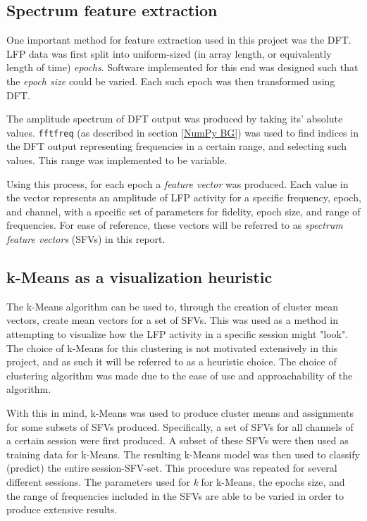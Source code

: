 \documentclass{kththesis}
\begin{document}
\subsection{Spectrum feature extraction}\label{DFT Method}

One important method for feature extraction used in this project was the DFT. 
LFP data was first split into uniform-sized (in array length, or equivalently length of time) \textit{epochs}.
Software implemented for this end was designed such that the \textit{epoch size} could be varied.
Each such epoch was then transformed using DFT.

The amplitude spectrum of DFT output was produced by taking its' absolute values. 
\texttt{fftfreq} (as described in section \ref{NumPy BG}) was used to find indices in the DFT output representing frequencies in a certain range, and selecting such values.
This range was implemented to be variable.

Using this process, for each epoch a \textit{feature vector} was produced. 
Each value in the vector represents an amplitude of LFP activity for a specific frequency, epoch, and channel, with a specific set of parameters for fidelity, epoch size, and range of frequencies.
For ease of reference, these vectors will be referred to as \textit{spectrum feature vectors} (SFVs) in this report.

\subsection{k-Means as a visualization heuristic}\label{KM Method}

The k-Means algorithm can be used to, through the creation of cluster mean vectors, create mean vectors for a set of SFVs.
This was used as a method in attempting to visualize how the LFP activity in a specific session might "look".
The choice of k-Means for this clustering is not motivated extensively in this project, and as such it will be referred to as a heuristic choice.
The choice of clustering algorithm was made due to the ease of use and approachability of the algorithm.

With this in mind, k-Means was used to produce cluster means and assignments for some subsets of SFVs produced.
Specifically, a set of SFVs for all channels of a certain session were first produced.
A subset of these SFVs were then used as training data for k-Means.
The resulting k-Means model was then used to classify (predict) the entire session-SFV-set.
This procedure was repeated for several different sessions.
The parameters used for \textit{k} for k-Means, the epochs size, and the range of frequencies included in the SFVs are able to be varied in order to produce extensive results. 
\end{document}
